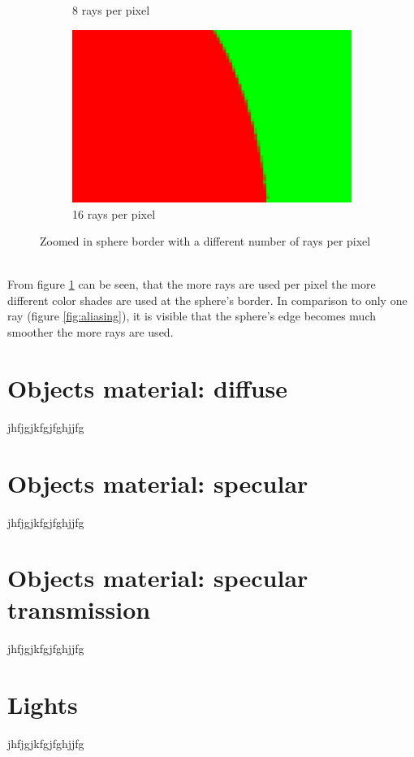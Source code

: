 \documentclass[12pt]{report}
\begin{document}
\begin{figure}[h!]
\begin{subfigure}[h!]{0.475\textwidth}
\caption{8 rays per pixel}
\end{subfigure}
\hfill
\begin{subfigure}[h!]{0.475\textwidth}
\centering
\includegraphics[width=\textwidth]{step4_16rays}
\caption{16 rays per pixel}
\end{subfigure}
\caption{Zoomed in sphere border with a different number of rays per pixel}
\label{fig:step4}
\end{figure} \\
From figure \ref{fig:step4} can be seen, that the more rays are used per pixel the more different color shades are used at the sphere's border. In comparison to only one ray (figure \ref{fig:aliasing}), it is visible that the sphere's edge becomes much smoother the more rays are used.

\chapter{Objects material: diffuse}
jhfjgjkfgjfghjjfg

\chapter{Objects material: specular}
jhfjgjkfgjfghjjfg

\chapter{Objects material: specular transmission}
jhfjgjkfgjfghjjfg

\chapter{Lights}
jhfjgjkfgjfghjjfg
\end{document}
